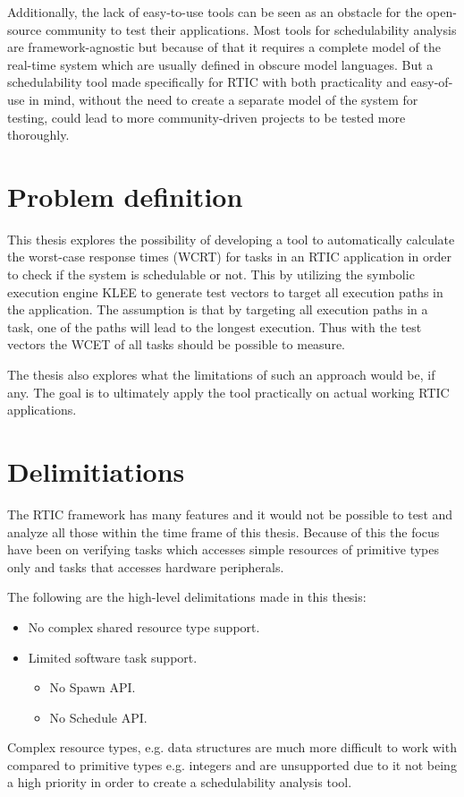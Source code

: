 Additionally, the lack of easy-to-use tools can be seen as an obstacle for the
open-source community to test their applications. Most tools for schedulability
analysis are framework-agnostic but because of that it requires a complete
model of the real-time system which are usually defined in obscure model
languages. But a schedulability tool made specifically for RTIC with both
practicality and easy-of-use in mind, without the need to create a separate
model of the system for testing, could lead to more community-driven projects
to be tested more thoroughly.

\section{Problem definition}
This thesis explores the possibility of developing a tool to automatically
calculate the worst-case response times (WCRT) for tasks in an RTIC application
in order to check if the system is schedulable or not. This by utilizing the
symbolic execution engine KLEE to generate test vectors to target all execution
paths in the application. The assumption is that by targeting all execution
paths in a task, one of the paths will lead to the longest execution. Thus
with the test vectors the WCET of all tasks should be possible to measure.

The thesis also explores what the limitations of such an approach would be, if
any. The goal is to ultimately apply the tool practically on actual working
RTIC applications.

\section{Delimitiations}
The RTIC framework has many features and it would not be possible to test and
analyze all those within the time frame of this thesis. Because of this the
focus have been on verifying tasks which accesses simple resources of primitive
types only and tasks that accesses hardware peripherals.

The following are the high-level delimitations made in this thesis:
\begin{itemize}
    \item No complex shared resource type support.
    \item Limited software task support.
    \begin{itemize}
        \item No Spawn API.
        \item No Schedule API.
    \end{itemize}
\end{itemize}
Complex resource types, e.g. data structures are much more difficult to work
with compared to primitive types e.g. integers and are unsupported due to it
not being a high priority in order to create a schedulability analysis tool.


